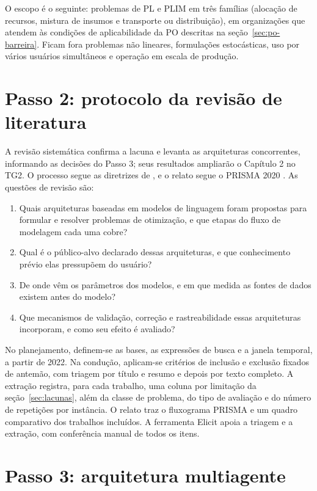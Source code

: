 O escopo é o seguinte: problemas de PL e PLIM em três famílias (alocação de recursos, mistura de insumos e transporte ou distribuição), em organizações que atendem às condições de aplicabilidade da PO descritas na seção~\ref{sec:po-barreira}. Ficam fora problemas não lineares, formulações estocásticas, uso por vários usuários simultâneos e operação em escala de produção.

\section{Passo 2: protocolo da revisão de literatura}
\label{sec:revisao}

A revisão sistemática confirma a lacuna e levanta as arquiteturas concorrentes, informando as decisões do Passo 3; seus resultados ampliarão o Capítulo 2 no TG2. O processo segue as diretrizes de , e o relato segue o PRISMA 2020 \cite{page2021}. As questões de revisão são:

\begin{enumerate}[label=QR\arabic*.]
  \item Quais arquiteturas baseadas em modelos de linguagem foram propostas para formular e resolver problemas de otimização, e que etapas do fluxo de modelagem cada uma cobre?
  \item Qual é o público-alvo declarado dessas arquiteturas, e que conhecimento prévio elas pressupõem do usuário?
  \item De onde vêm os parâmetros dos modelos, e em que medida as fontes de dados existem antes do modelo?
  \item Que mecanismos de validação, correção e rastreabilidade essas arquiteturas incorporam, e como seu efeito é avaliado?
\end{enumerate}

No planejamento, definem-se as bases, as expressões de busca e a janela temporal, a partir de 2022. Na condução, aplicam-se critérios de inclusão e exclusão fixados de antemão, com triagem por título e resumo e depois por texto completo. A extração registra, para cada trabalho, uma coluna por limitação da seção~\ref{sec:lacunas}, além da classe de problema, do tipo de avaliação e do número de repetições por instância. O relato traz o fluxograma PRISMA e um quadro comparativo dos trabalhos incluídos. A ferramenta Elicit apoia a triagem e a extração, com conferência manual de todos os itens.

\section{Passo 3: arquitetura multiagente}
\label{sec:arquitetura}

